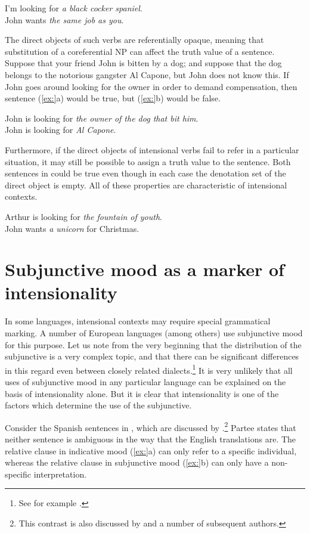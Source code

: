 \ea
\ea I’m looking for \textit{a black cocker spaniel}.\\
\ex John wants \textit{the same job as you}.
                       \z
\z


The direct objects of such verbs are referentially opaque, meaning that substitution of a coreferential NP can affect the truth value of a sentence. Suppose that your friend John is bitten by a dog; and suppose that the dog belongs to the notorious gangster Al Capone, but John does not know this. If John goes around looking for the owner in order to demand compensation, then sentence (\ref{ex:}a) would be true, but (\ref{ex:}b) would be false.


\ea
\ea John is looking for \textit{the owner of the dog that bit him}.\\
\ex John is looking for \textit{Al Capone}.
                       \z
\z


Furthermore, if the direct objects of intensional verbs fail to refer in a particular situation, it may still be possible to assign a truth value to the sentence. Both sentences in  could be true even though in each case the denotation set of the direct object is empty. All of these properties are characteristic of intensional contexts.


\ea
\ea Arthur is looking for \textit{the fountain of youth}.\\
\ex John wants \textit{a unicorn} for Christmas.
                       \z
\z

\section{Subjunctive mood as a marker of intensionality}\label{sec:} %

In some languages, intensional contexts may require special grammatical marking. A number of European languages (among others) use subjunctive mood for this purpose. Let us note from the very beginning that the distribution of the subjunctive is a very complex topic, and that there can be significant differences in this regard even between closely related dialects.\footnote{See for example \citet{Marques2004}.} It is very unlikely that all uses of subjunctive mood in any particular language can be explained on the basis of intensionality alone. But it is clear that intensionality is one of the factors which determine the use of the subjunctive.



Consider the Spanish sentences in , which are discussed by \citet{Partee2008}.\footnote{This contrast is also discussed by \citet{Quine1956} and a number of subsequent authors.} Partee states that neither sentence is ambiguous in the way that the English translations are. The relative clause in indicative mood (\ref{ex:}a) can only refer to a specific individual, whereas the relative clause in subjunctive mood (\ref{ex:}b) can only have a non-specific interpretation.


